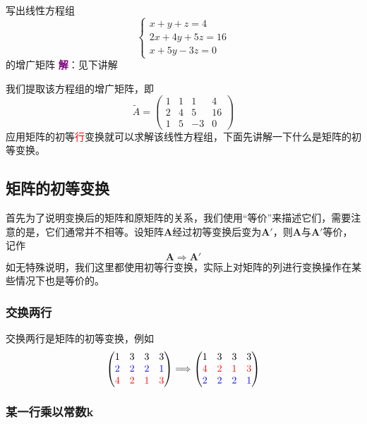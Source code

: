 \begin{example}
	写出线性方程组$$\left\{\begin{matrix} 
		x+y+z=4 \\  
		2x+4y+5z=16 \\
		x+5y-3z=0
	\end{matrix}\right. $$的增广矩阵
	\tcblower
	\textcolor{purple}{\textbf{解}}：见下讲解
\end{example}

我们提取该方程组的增广矩阵，即$$\tilde{A}=\begin{pmatrix}
	1 & 1 & 1 & 4\\
	2 & 4 & 5 & 16\\
	1 & 5 & -3 & 0
\end{pmatrix}$$应用矩阵的初等\textcolor{red}{行}变换就可以求解该线性方程组，下面先讲解一下什么是矩阵的初等变换。

\subsection{矩阵的初等变换}

首先为了说明变换后的矩阵和原矩阵的关系，我们使用``等价''来描述它们，需要注意的是，它们通常并不相等。设矩阵$\mathbf{A}$经过初等变换后变为$\mathbf{A}'$，则$\mathbf{A}$与$\mathbf{A}'$等价，记作$$\mathbf{A}\Longrightarrow  \mathbf{A}'$$如无特殊说明，我们这里都使用初等行变换，实际上对矩阵的列进行变换操作在某些情况下也是等价的。

\subsubsection{交换两行}

交换两行是矩阵的初等变换，例如$$\begin{pmatrix}
	1 & 3 & 3 & 3\\
\textcolor{blue}{2} & \textcolor{blue}{2} & \textcolor{blue}{2} & \textcolor{blue}{1}\\
	\textcolor{red}{4} & \textcolor{red}{2} & \textcolor{red}{1} & \textcolor{red}{3}
\end{pmatrix}\Longrightarrow \begin{pmatrix}
	1 & 3 & 3 & 3\\
	\textcolor{red}{4} & \textcolor{red}{2} & \textcolor{red}{1} & \textcolor{red}{3}\\
	\textcolor{blue}{2} & \textcolor{blue}{2} & \textcolor{blue}{2} & \textcolor{blue}{1}
\end{pmatrix}$$

\subsubsection{某一行乘以常数k}

